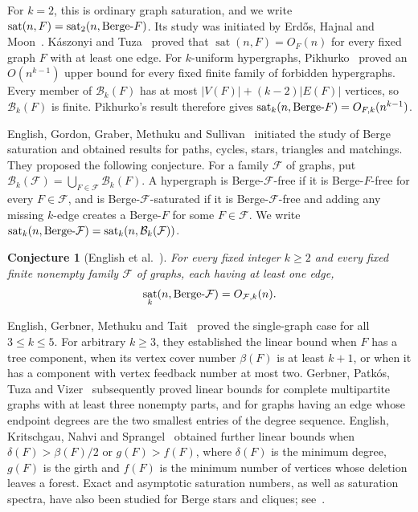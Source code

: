 \documentclass[10pt,a4paper]{article}
\numberwithin{equation}{section}
\newtheorem{conjecture}[theorem]{Conjecture}
\theoremstyle{definition}
\theoremstyle{plain}
\DeclareMathOperator{\sat}{sat}
\newcommand{\BF}{\textup{Berge-}F}
\begin{document}
For $k=2$, this is ordinary graph saturation, and we write
$\sat(n,F)=\sat_2(n,\BF)$. Its study was initiated by
Erd\H{o}s, Hajnal and Moon~\cite{EHM}. K\'aszonyi and
Tuza~\cite{KT} proved that $\sat(n,F)=O_F(n)$ for every fixed graph
$F$ with at least one edge. For $k$-uniform hypergraphs, Pikhurko~\cite{Pik} proved an
$O(n^{k-1})$ upper bound for every fixed finite family of forbidden
hypergraphs. Every member of $\mathcal B_k(F)$ has at most
$|V(F)|+(k-2)|E(F)|$ vertices, so $\mathcal B_k(F)$ is finite.
Pikhurko's result therefore gives
$\sat_k(n,\BF)=O_{F,k}(n^{k-1})$.

English, Gordon, Graber, Methuku and Sullivan~\cite{EGGMS}
initiated the study of Berge saturation and obtained results for
paths, cycles, stars, triangles and matchings. They proposed the
following conjecture. For a family $\mathcal F$ of graphs, put
$\mathcal B_k(\mathcal F)=\bigcup_{F\in\mathcal F}\mathcal B_k(F)$.
A hypergraph is Berge-$\mathcal F$-free if it is Berge-$F$-free for
every $F\in\mathcal F$, and is Berge-$\mathcal F$-saturated if it is
Berge-$\mathcal F$-free and adding any missing $k$-edge creates a
Berge-$F$ for some $F\in\mathcal F$. We write
$\sat_k(n,\textup{Berge-}\mathcal F)=\sat_k(n,\mathcal B_k(\mathcal F))$.

\begin{conjecture}[English et al.~{\cite[Conjecture~6.3]{EGGMS}}]\label{conj:family}
For every fixed integer $k\ge2$ and every fixed finite nonempty family
$\mathcal F$ of graphs, each having at least one edge,
\[
 \sat_k(n,\textup{Berge-}\mathcal F)=O_{\mathcal F,k}(n).
\]
\end{conjecture}

English, Gerbner, Methuku and Tait~\cite{EGMT} proved the single-graph
case for all $3\le k\le5$. For arbitrary $k\ge3$, they established
the linear bound when $F$ has a tree component, when its vertex cover
number $\beta(F)$ is at least $k+1$, or when it has a component with
vertex feedback number at most two. Gerbner, Patk\'os, Tuza and
Vizer~\cite[Theorems~1.2 and~1.3]{GPTV} subsequently proved linear bounds
for complete multipartite graphs with at least three nonempty parts,
and for graphs having an edge whose endpoint degrees are the two
smallest entries of the degree sequence.
English, Kritschgau, Nahvi and Sprangel~\cite{EKNS} obtained further
linear bounds when $\delta(F)>\beta(F)/2$ or $g(F)>f(F)$, where
$\delta(F)$ is the minimum degree, $g(F)$ is the girth and $f(F)$
is the minimum number of vertices whose deletion leaves a forest.
Exact and asymptotic saturation numbers, as well as saturation spectra,
have also been studied for Berge stars and cliques;
see~\cite{AE,BEHJR,EKNS,CHX}.
\end{document}
